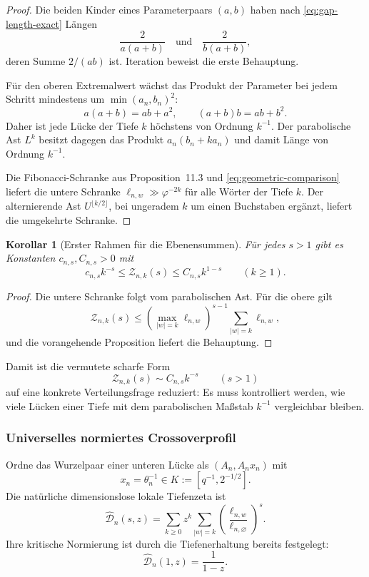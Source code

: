 \documentclass[11pt,a4paper]{article}
\newtheorem{corollary}[remark]{Korollar}
\begin{document}
\begin{proof}
Die beiden Kinder eines Parameterpaars $(a,b)$ haben nach
\eqref{eq:gap-length-exact} Längen
\[
 \frac{2}{a(a+b)}\quad\text{und}\quad
 \frac{2}{b(a+b)},
\]
deren Summe $2/(ab)$ ist. Iteration beweist die erste Behauptung.

Für den oberen Extremalwert wächst das Produkt der Parameter bei jedem
Schritt mindestens um $\min(a_n,b_n)^2$:
\[
 a(a+b)=ab+a^2,\qquad (a+b)b=ab+b^2.
\]
Daher ist jede Lücke der Tiefe $k$ höchstens von Ordnung $k^{-1}$.
Der parabolische Ast $L^k$ besitzt dagegen das Produkt
$a_n(b_n+ka_n)$ und damit Länge von Ordnung $k^{-1}$.

Die Fibonacci-Schranke aus Proposition~11.3 und
\eqref{eq:geometric-comparison} liefert die untere Schranke
$\ell_{n,w}\gg\varphi^{-2k}$ für alle Wörter der Tiefe $k$. Der
alternierende Ast $U^{\lfloor k/2\rfloor}$, bei ungeradem $k$ um einen
Buchstaben ergänzt, liefert die umgekehrte Schranke.
\end{proof}

\begin{corollary}[Erster Rahmen für die Ebenensummen]
Für jedes $s>1$ gibt es Konstanten $c_{n,s},C_{n,s}>0$ mit
\[
 c_{n,s}k^{-s}\le\mathcal Z_{n,k}(s)
 \le C_{n,s}k^{1-s}
 \qquad(k\ge1).
\]
\end{corollary}

\begin{proof}
Die untere Schranke folgt vom parabolischen Ast. Für die obere gilt
\[
 \mathcal Z_{n,k}(s)
 \le \left(\max_{|w|=k}\ell_{n,w}\right)^{s-1}
 \sum_{|w|=k}\ell_{n,w},
\]
und die vorangehende Proposition liefert die Behauptung.
\end{proof}

Damit ist die vermutete scharfe Form
\[
 \mathcal Z_{n,k}(s)\sim C_{n,s}k^{-s}\qquad(s>1)
\]
auf eine konkrete Verteilungsfrage reduziert: Es muss kontrolliert werden,
wie viele Lücken einer Tiefe mit dem parabolischen Maßstab $k^{-1}$
vergleichbar bleiben.

\subsubsection{Universelles normiertes Crossoverprofil}

Ordne das Wurzelpaar einer unteren Lücke als $(A_n,A_nx_n)$ mit
\[
 x_n=\theta_n^{-1}\in
 K:=\left[q^{-1},2^{-1/2}\right].
\]
Die natürliche dimensionslose lokale Tiefenzeta ist
\[
 \widehat{\mathscr D}_n(s,z)
 =
 \sum_{k\ge0}z^k
 \sum_{|w|=k}
 \left(\frac{\ell_{n,w}}{\ell_{n,\varnothing}}\right)^s.
\]
Ihre kritische Normierung ist durch die Tiefenerhaltung bereits
festgelegt:
\[
 \widehat{\mathscr D}_n(1,z)=\frac1{1-z}.
\]
\end{document}
